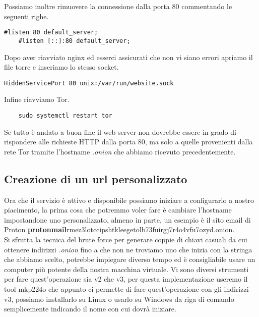 Possiamo inoltre rimuovere la connessione dalla porta 80 commentando le seguenti righe.
\begin{lstlisting}[caption={Rimozione connessione dalla porta 80}]
    #listen 80 default_server;
    #listen [::]:80 default_server;
\end{lstlisting}


Dopo aver riavviato nginx ed esserci assicurati che non vi siano errori apriamo il file torrc e inseriamo lo stesso socket.
\begin{lstlisting}[caption={Aggiunta socket unix a torrc}]
    HiddenServicePort 80 unix:/var/run/website.sock
\end{lstlisting}

Infine riavviamo Tor.
\begin{lstlisting}
    sudo systemctl restart tor
\end{lstlisting}
Se tutto è andato a buon fine il web server non dovrebbe essere in grado di rispondere alle richieste HTTP dalla porta 80, ma solo a quelle provenienti dalla rete Tor tramite l'hostname \emph{.onion} che abbiamo ricevuto precedentemente. \\

\newpage
\subsection{Creazione di un url personalizzato}
Ora che il servizio è attivo e disponibile possiamo iniziare a configurarlo a nostro piacimento, la prima cosa che potremmo voler fare è cambiare l'hostname impostandone uno personalizzato, almeno in parte, un esempio è il sito email di Proton \textbf{protonmail}rmez3lotccipshtkleegetolb73fuirgj7r4o4vfu7ozyd.onion. \\
Si sfrutta la tecnica del brute force per generare coppie di chiavi casuali da cui ottenere indirizzi \emph{.onion} fino a che non ne troviamo uno che inizia con la stringa che abbiamo scelto, potrebbe impiegare diverso tempo ed è consigliabile usare un computer più potente della nostra macchina virtuale. 
Vi sono diversi strumenti per fare quest'operazione sia v2 che v3, per questa implementazione useremo il tool mkp224o \cite{V3AddressGeneratorRepo} che appunto ci permette di fare quest'operazione con gli indirizzi v3, possiamo installarlo su Linux o usarlo su Windows da riga di comando semplicemente indicando il nome con cui dovrà iniziare.

